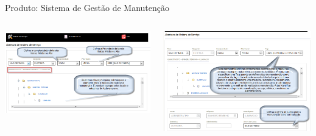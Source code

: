 \begin{frame}{Produto: Sistema de Gestão de Manutenção}
	\framebreak
	
	

		
	
	\begin{columns}
		\begin{column}{0.45\textwidth}
			\includegraphics[width=1\textwidth]{imagens/sgm-05}
		\end{column}
		\begin{column}{0.45\textwidth}
			\includegraphics[width=1\textwidth]{imagens/sgm-06}
		\end{column}
	\end{columns}
	

\end{frame}
